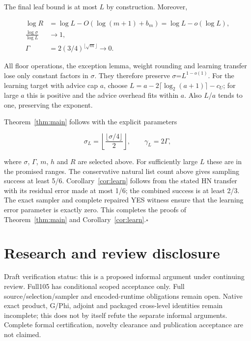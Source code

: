 The final leaf bound is at most \(L\) by construction. Moreover,

\begin{equation}\label{eq:29}
\begin{aligned}\log R&=\log L-O(\log(m+1)+b_m)=\log L-o(\log L),\\\frac{\log\sigma}{\log L}&\longrightarrow1,\\\Gamma&=2(3/4)^{\lfloor\sqrt m\rfloor}\longrightarrow0.\end{aligned}
\end{equation}

All floor operations, the exception lemma, weight rounding and learning transfer lose only constant factors in \(\sigma\). They therefore preserve \(\sigma\)=\(L^{1-o(1)}\). For the learning target with advice cap \(a\), choose \(L=a-2\lceil\log_2(a+1)\rceil-c_U\); for large \(a\) this is positive and the advice overhead fits within \(a\). Also \(L\)/\(a\) tends to one, preserving the exponent.

Theorem~\ref{thm:main} follows with the explicit parameters

\begin{equation}\label{eq:30}
\sigma_L=\left\lfloor\frac{\lfloor\sigma/4\rfloor}{2}\right\rfloor,\qquad\gamma_L=2\Gamma,
\end{equation}

where \(\sigma\), \(\Gamma\), \(m\), \(h\) and \(R\) are selected above. For sufficiently large \(L\) these are in the promised ranges. The conservative natural list count above gives sampling success at least 5/6. Corollary~\ref{cor:learn} follows from the stated HN transfer with its residual error made at most 1/6; the combined success is at least 2/3. The exact sampler and complete repaired YES witness ensure that the learning error parameter is exactly zero. This completes the proofs of Theorem~\ref{thm:main} and Corollary~\ref{cor:learn}.\hfill$\square$

\section{Research and review disclosure}\label{sec:11}
Draft verification status: this is a proposed informal argument under continuing review. Full105 has conditional scoped acceptance only. Full source/selection/sampler and encoded-runtime obligations remain open. Native exact product, G/Phi, adjoint and packaged cross-level identities remain incomplete; this does not by itself refute the separate informal arguments. Complete formal certification, novelty clearance and publication acceptance are not claimed.


